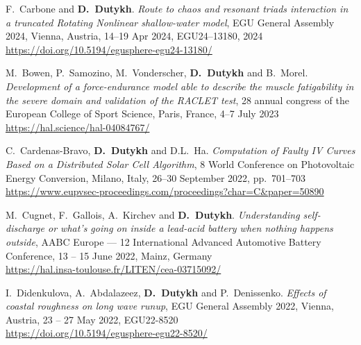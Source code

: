 \documentclass[final, a4paper, oneside, 12pt]{article}
\numberwithin{equation}{section}
\begin{document}
\begin{etaremune}
  \item F.~Carbone and \textbf{D.~Dutykh}. \textit{Route to chaos and resonant triads interaction in a truncated Rotating Nonlinear shallow-water model}, EGU General Assembly 2024, Vienna, Austria, 14--19 Apr 2024, EGU24--13180, 2024 \\ %
  \url{https://doi.org/10.5194/egusphere-egu24-13180/}



  \item M.~Bowen, P.~Samozino, M.~Vonderscher, \textbf{D.~Dutykh} and B.~Morel. \textit{Development of a force-endurance model able to describe the muscle fatigability in the severe domain and validation of the RACLET test}, 28 annual congress of the European College of Sport Science, Paris, France, 4--7 July 2023 \\ %
  \url{https://hal.science/hal-04084767/}



  \item C.~Cardenas-Bravo, \textbf{D.~Dutykh} and D.L.~Ha. \textit{Computation of Faulty IV Curves Based on a Distributed Solar Cell Algorithm}, 8 World Conference on Photovoltaic Energy Conversion, Milano, Italy, 26--30 September 2022, pp.~701--703 \\ %
  \url{https://www.eupvsec-proceedings.com/proceedings?char=C&paper=50890}
  
  \item M.~Cugnet, F.~Gallois, A.~Kirchev and \textbf{D.~Dutykh}. \textit{Understanding self-discharge or what's going on inside a lead-acid battery when nothing happens outside}, AABC Europe --- 12 International Advanced Automotive Battery Conference, 13 -- 15 June 2022, Mainz, Germany \\
  \url{https://hal.insa-toulouse.fr/LITEN/cea-03715092/}
  
  \item I.~Didenkulova, A.~Abdalazeez, \textbf{D.~Dutykh} and P.~Denissenko. \textit{Effects of coastal roughness on long wave runup}, EGU General Assembly 2022, Vienna, Austria, 23 -- 27 May 2022, EGU22-8520 \\
  \url{https://doi.org/10.5194/egusphere-egu22-8520/}


\end{etaremune}
\end{document}
